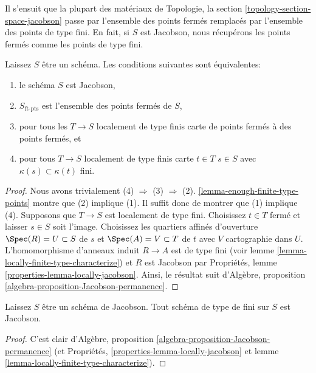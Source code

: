 \noindent
Il s'ensuit que la plupart des matériaux de Topologie, la section \ref{topology-section-space-jacobson} passe par l'ensemble des points fermés remplacés par l'ensemble des points de type fini. En fait, si $S$ est Jacobson, nous récupérons les points fermés comme les points de type fini.

\begin{lemma}

\label{lemma-jacobson-finite-type-points}
Laissez $S$ être un schéma. Les conditions suivantes sont équivalentes:
\begin{enumerate}
\item le schéma $S$ est Jacobson,
\item $S_{\text{ft-pts}}$ est l'ensemble des points fermés de $S$,
\item pour tous les $T \to S$ localement de type finis carte de points fermés à des points fermés, et
\item pour tous $T \to S$ localement de type finis carte $t \in T$ $s \in S$ avec $\kappa(s) \subset \kappa(t)$ fini.
\end{enumerate}

\end{lemma}

\begin{proof}

Nous avons trivialement (4) $\Rightarrow$ (3) $\Rightarrow$ (2). \ref{lemma-enough-finite-type-points} montre que (2) implique (1). Il suffit donc de montrer que (1) implique (4). Supposons que $T \to S$ est localement de type fini. Choisissez $t \in T$ fermé et laisser $s \in S$ soit l'image. Choisissez les quartiers affinés d'ouverture $\Spec(R) = U \subset S$ de $s$ et
$\Spec(A) = V \subset T$ de $t$ avec $V$ cartographie dans $U$. L'homomorphisme d'anneaux induit $R \to A$ est de type fini (voir lemme \ref{lemma-locally-finite-type-characterize}) et $R$ est Jacobson par Propriétés, lemme \ref{properties-lemma-locally-jacobson}. Ainsi, le résultat suit d'Algèbre, proposition \ref{algebra-proposition-Jacobson-permanence}.

\end{proof}

\begin{lemma}

\label{lemma-Jacobson-universally-Jacobson}
Laissez $S$ être un schéma de Jacobson. Tout schéma de type de fini sur $S$ est Jacobson.
\end{lemma}

\begin{proof}

C'est clair d'Algèbre, proposition \ref{algebra-proposition-Jacobson-permanence}
(et Propriétés, \ref{properties-lemma-locally-jacobson} et lemme \ref{lemma-locally-finite-type-characterize}).

\end{proof}

